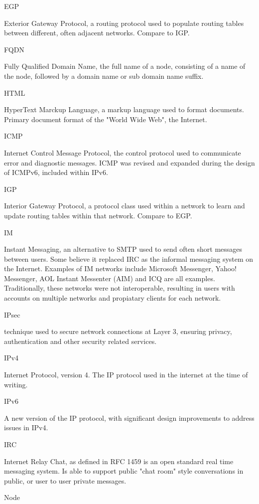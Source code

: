 EGP

Exterior Gateway Protocol, a routing protocol used to populate routing
tables between different, often adjacent networks. Compare to IGP.

FQDN

Fully Qualified Domain Name, the full name of a node, consisting of a
name of the node, followed by a domain name or sub domain name suffix.

HTML

HyperText Marckup Language, a markup language used to format documents.
Primary document format of the "World Wide Web", the Internet.

ICMP

Internet Control Message Protocol, the control protocol used to
communicate error and diagnostic messages. ICMP was revised and expanded 
during the design of ICMPv6, included within IPv6.

IGP

Interior Gateway Protocol, a protocol class used within a network to
learn and update routing tables within that network. Compare to EGP.

IM

Instant Messaging, an alternative to SMTP used to send often short
messages between users. Some believe it replaced IRC as the informal
messaging system on the Internet. Examples of IM networks include 
Microsoft Messenger, Yahoo! Messenger, AOL Instant Messenter (AIM) and 
ICQ are all examples. Traditionally, these networks were not
interoperable, resulting in users with accounts on multiple networks and
propiatary clients for each network.

IPsec

technique used to secure network connections at Layer 3, ensuring
privacy, authentication and other security related services. 

IPv4

Internet Protocol, version 4. The IP protocol used in the internet
at the time of writing.

IPv6

A new version of the IP protocol, with significant design improvements
to address issues in IPv4.

IRC

Internet Relay Chat, as defined in RFC 1459 is an open standard real
time messaging system. Is able to support public "chat room" style
conversations in public, or user to user private messages.


Node

